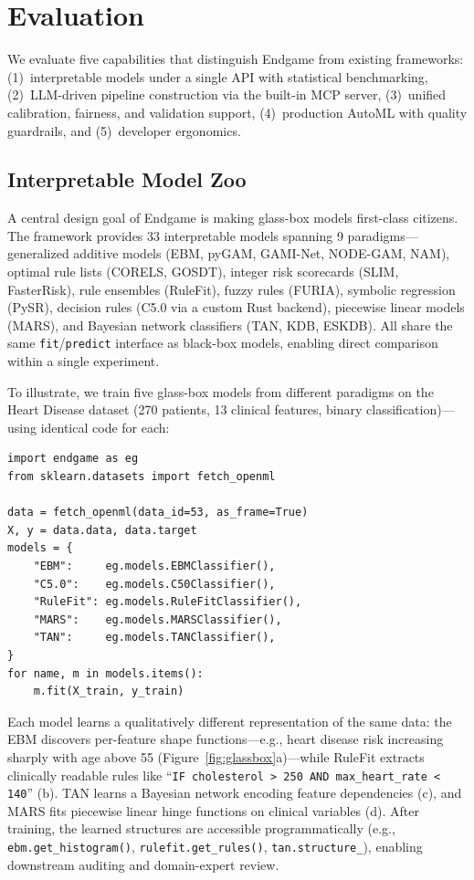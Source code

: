 \documentclass[11pt]{article}
\begin{document}
\FloatBarrier
\section{Evaluation}
\label{sec:evaluation}

We evaluate five capabilities that distinguish Endgame from existing
frameworks: (1)~interpretable models under a single API with statistical
benchmarking, (2)~LLM-driven pipeline construction via the built-in MCP
server, (3)~unified calibration, fairness, and validation support,
(4)~production AutoML with quality guardrails, and (5)~developer ergonomics.

\subsection{Interpretable Model Zoo}
\label{sec:eval:glassbox}

A central design goal of Endgame is making glass-box models first-class
citizens. The framework provides 33 interpretable models spanning 9
paradigms---generalized additive models (EBM, pyGAM, GAMI-Net, NODE-GAM,
NAM), optimal rule lists (CORELS, GOSDT), integer risk scorecards (SLIM,
FasterRisk), rule ensembles (RuleFit), fuzzy rules (FURIA), symbolic
regression (PySR), decision rules (C5.0 via a custom Rust backend),
piecewise linear models (MARS), and Bayesian network classifiers (TAN, KDB,
ESKDB). All share the same \texttt{fit}/\texttt{predict} interface as
black-box models, enabling direct comparison within a single experiment.

To illustrate, we train five glass-box models from different paradigms on
the Heart Disease dataset (270 patients, 13 clinical features, binary
classification)---using identical code for each:

\begin{lstlisting}
import endgame as eg
from sklearn.datasets import fetch_openml

data = fetch_openml(data_id=53, as_frame=True)
X, y = data.data, data.target
models = {
    "EBM":     eg.models.EBMClassifier(),
    "C5.0":    eg.models.C50Classifier(),
    "RuleFit": eg.models.RuleFitClassifier(),
    "MARS":    eg.models.MARSClassifier(),
    "TAN":     eg.models.TANClassifier(),
}
for name, m in models.items():
    m.fit(X_train, y_train)
\end{lstlisting}

\noindent Each model learns a qualitatively different representation of the
same data: the EBM discovers per-feature shape functions---e.g., heart
disease risk increasing sharply with age above 55
(Figure~\ref{fig:glassbox}a)---while RuleFit extracts clinically readable
rules like ``\texttt{IF cholesterol > 250 AND max\_heart\_rate < 140}'' (b).
TAN learns a Bayesian network encoding feature dependencies (c), and MARS
fits piecewise linear hinge functions on clinical variables (d). After
training, the learned structures are accessible programmatically (e.g.,
\texttt{ebm.get\_histogram()}, \texttt{rulefit.get\_rules()},
\texttt{tan.structure\_}), enabling downstream auditing and domain-expert
review.
\end{document}
